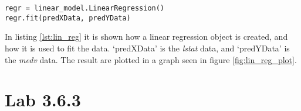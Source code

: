 \lstset{}
\begin{lstlisting}[caption={Python Linear Regression function}, label=lst:lin_reg, mathescape=true]
regr = linear_model.LinearRegression()
regr.fit(predXData, predYData)
\end{lstlisting}

In listing \ref{lst:lin_reg} it is shown how a linear regression object is created, and how it is used to fit the data. ‘predXData’ is the \emph{lstat} data, and ‘predYData’ is the \emph{medv} data.
The result are plotted in a graph seen in figure \ref{fig:lin_reg_plot}.

 

\section{Lab 3.6.3}
